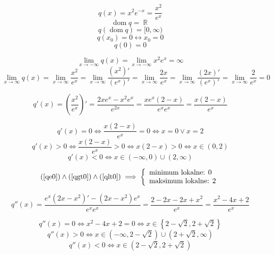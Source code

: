 \documentclass[12pt]{article}
\let\oldref\ref
\renewcommand{\ref}[1]{(\oldref{#1})}
\DeclareMathOperator{\dom}{dom}
\DeclareMathOperator{\R}{\mathbb{R}}
\begin{document}
$$ q(x) = x^2 e^{-x} = \frac{x^2}{e^x} $$
$$ \dom{q} = \R $$
$$ q(\dom{q}) = [0, \infty ) $$
$$ q(x_0) = 0 \leftrightarrow x_0 = 0 $$
$$ q(0) = 0 $$

$$ \lim_{x \to -\infty}{q(x)} = \lim_{x \to -\infty}{x^2e^x} = \infty $$
%
$$
\lim_{x \to \infty}{q(x)} =
\lim_{x \to \infty}{\frac{x^2}{e^x}} =
\lim_{x \to \infty}{\frac{(x^2)'}{(e^x)'}} =
\lim_{x \to \infty}{\frac{2x}{e^x}} =
\lim_{x \to \infty}{\frac{(2x)'}{(e^x)'}} =
\lim_{x \to \infty}{\frac{2}{e^x}} =
0
$$

$$ q'(x) = \left(\frac{x^2}{e^x}\right)' = \frac{2xe^x - x^2e^x}{e^{2x}}
= \frac{xe^x(2-x)}{e^xe^x} = \frac{x(2-x)}{e^x} $$

\begin{equation} \label{qe0}
    q'(x) = 0 \Leftrightarrow \frac{x(2-x)}{e^x} = 0 \Leftrightarrow x = 0 \lor x = 2
\end{equation}
\begin{equation} \label{qgt0}
    q'(x) > 0 \Leftrightarrow \frac{x(2-x)}{e^x} > 0 \Leftrightarrow
    x(2-x) > 0 \Leftrightarrow x \in (0,2)
\end{equation}
\begin{equation} \label{qlt0}
    q'(x) < 0 \Leftrightarrow x \in (-\infty,0)\cup(2,\infty)
\end{equation}

$$ \ref{qe0} \land \ref{qgt0} \land \ref{qlt0} \implies
\left\{ \begin{array}{ll}
    \textrm{minimum  lokalne: } 0\\
    \textrm{maksimum lokalne: } 2
\end{array} \right.
$$

$$ q''(x) = \frac{e^x(2x-x^2)' - (2x-x^2)e^x}{e^xe^x} =
\frac{2 - 2x - 2x + x^2}{e^x} = \frac{x^2 - 4x + 2}{e^x} $$

$$ q''(x) = 0 \Leftrightarrow x^2 - 4x + 2 = 0 \Leftrightarrow
x \in \left\{ 2 - \sqrt{2}, 2 + \sqrt{2} \right\} $$
%
$$ q''(x) > 0 \Leftrightarrow x \in (-\infty, 2-\sqrt{2})\cup(2+\sqrt{2}, \infty)$$
%
$$ q''(x) < 0 \Leftrightarrow x \in (2-\sqrt{2}, 2+\sqrt{2}) $$
\end{document}
